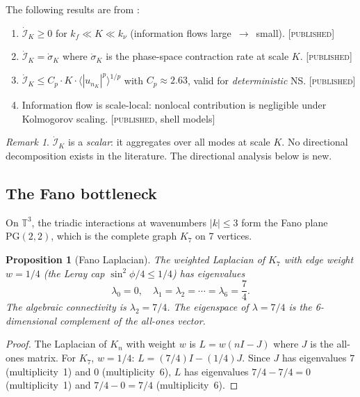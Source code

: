 \documentclass[11pt]{article}
\newtheorem{proposition}[theorem]{Proposition}
\theoremstyle{definition}
\theoremstyle{remark}
\newtheorem{remark}[theorem]{Remark}
\begin{document}
The following results are from \cite{TanogamiAraki2024,TanogamiAraki2025,Tanogami2025}:

\begin{enumerate}
  \item[\textsc{P1.}] $\dot{\mathcal{I}}_K \geq 0$ for $k_f \ll K \ll k_\nu$
    (information flows large~$\to$~small). \hfill[\textsc{published}]
  \item[\textsc{P2.}] $\dot{\mathcal{I}}_K = \dot{\sigma}_K$ where
    $\dot{\sigma}_K$ is the phase-space contraction rate at scale $K$.
    \hfill[\textsc{published}]
  \item[\textsc{P3.}] $\dot{\mathcal{I}}_K \leq C_p \cdot K \cdot
    \langle |u_{n_K}|^p \rangle^{1/p}$ with $C_p \approx 2.63$,
    valid for \emph{deterministic} NS. \hfill[\textsc{published}]
  \item[\textsc{P4.}] Information flow is scale-local: nonlocal
    contribution is negligible under Kolmogorov scaling.
    \hfill[\textsc{published}, shell models]
\end{enumerate}

\begin{remark}
$\dot{\mathcal{I}}_K$ is a \emph{scalar}: it aggregates over all
modes at scale $K$. No directional decomposition exists in the
literature. The directional analysis below is new.
\end{remark}

\subsection{The Fano bottleneck}

On $\mathbb{T}^3$, the triadic interactions at wavenumbers $|k| \leq 3$
form the Fano plane $\mathrm{PG}(2,2)$, which is the complete graph
$K_7$ on 7 vertices.

\begin{proposition}[Fano Laplacian]\label{prop:fano-lap}
The weighted Laplacian of $K_7$ with edge weight $w = 1/4$
(the Leray cap $\sin^2\phi/4 \leq 1/4$) has eigenvalues
\[
  \lambda_0 = 0, \quad
  \lambda_1 = \lambda_2 = \cdots = \lambda_6 = \frac{7}{4}.
\]
The algebraic connectivity is $\lambda_2 = 7/4$. The eigenspace of
$\lambda = 7/4$ is the 6-dimensional complement of the all-ones vector.
\end{proposition}

\begin{proof}
The Laplacian of $K_n$ with weight $w$ is $L = w(nI - J)$ where $J$
is the all-ones matrix. For $K_7$, $w = 1/4$:
$L = (7/4)I - (1/4)J$. Since $J$ has eigenvalues $7$ (multiplicity~1)
and $0$ (multiplicity~6), $L$ has eigenvalues $7/4 - 7/4 = 0$
(multiplicity~1) and $7/4 - 0 = 7/4$ (multiplicity~6).
\end{proof}
\end{document}
